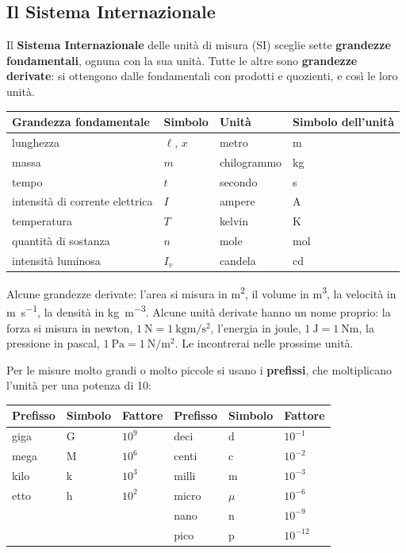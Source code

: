 \subsection{Il Sistema Internazionale}

Il \textbf{Sistema Internazionale} delle unità di misura (SI) sceglie sette \textbf{grandezze fondamentali}, ognuna con la sua unità. Tutte le altre sono \textbf{grandezze derivate}: si ottengono dalle fondamentali con prodotti e quozienti, e così le loro unità.

\begin{center}
\small
\begin{tabular}{@{}llll@{}}
\toprule
Grandezza fondamentale & Simbolo & Unità & Simbolo dell'unità \\
\midrule
lunghezza & $\ell$, $x$ & metro & \si{\metre} \\
massa & $m$ & chilogrammo & \si{\kilo\gram} \\
tempo & $t$ & secondo & \si{\second} \\
intensità di corrente elettrica & $I$ & ampere & \si{\ampere} \\
temperatura & $T$ & kelvin & \si{\kelvin} \\
quantità di sostanza & $n$ & mole & \si{\mole} \\
intensità luminosa & $I_v$ & candela & \si{\candela} \\
\bottomrule
\end{tabular}
\end{center}

Alcune grandezze derivate: l'area si misura in \si{\metre\squared}, il volume in \si{\metre\cubed}, la velocità in \si{\metre\per\second}, la densità in \si{\kilo\gram\per\metre\cubed}. Alcune unità derivate hanno un nome proprio: la forza si misura in newton, $\SI{1}{\newton} = \SI{1}{\kilo\gram\metre\per\second\squared}$, l'energia in joule, $\SI{1}{\joule} = \SI{1}{\newton\metre}$, la pressione in pascal, $\SI{1}{\pascal} = \SI{1}{\newton\per\metre\squared}$. Le incontrerai nelle prossime unità.

Per le misure molto grandi o molto piccole si usano i \textbf{prefissi}, che moltiplicano l'unità per una potenza di 10:

\begin{center}
\small
\begin{tabular}{@{}lll@{\qquad}lll@{}}
\toprule
Prefisso & Simbolo & Fattore & Prefisso & Simbolo & Fattore \\
\midrule
giga & G & $10^{9}$ & deci & d & $10^{-1}$ \\
mega & M & $10^{6}$ & centi & c & $10^{-2}$ \\
kilo & k & $10^{3}$ & milli & m & $10^{-3}$ \\
etto & h & $10^{2}$ & micro & $\mu$ & $10^{-6}$ \\
& & & nano & n & $10^{-9}$ \\
& & & pico & p & $10^{-12}$ \\
\bottomrule
\end{tabular}
\end{center}

